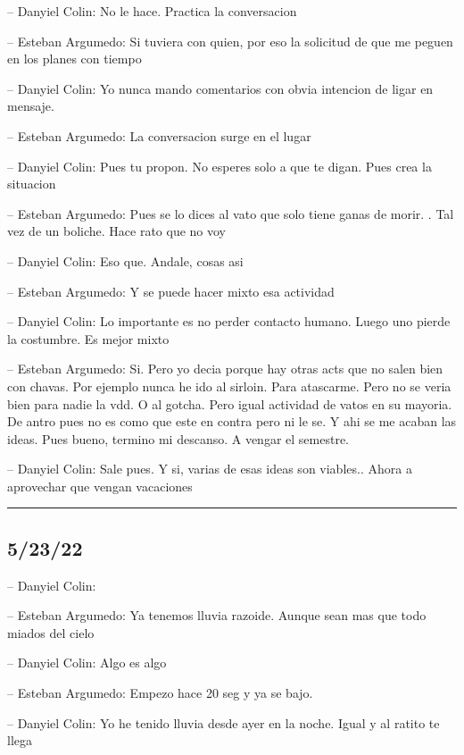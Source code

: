 -- Danyiel Colin: No le hace. Practica la conversacion

-- Esteban Argumedo: Si tuviera con quien, por eso la solicitud de que
me peguen en los planes con tiempo

-- Danyiel Colin: Yo nunca mando comentarios con obvia intencion de
ligar en mensaje.

-- Esteban Argumedo: La conversacion surge en el lugar

-- Danyiel Colin: Pues tu propon. No esperes solo a que te digan. Pues
crea la situacion

-- Esteban Argumedo: Pues se lo dices al vato que solo tiene ganas de
morir. . Tal vez de un boliche. Hace rato que no voy

-- Danyiel Colin: Eso que. Andale, cosas asi

-- Esteban Argumedo: Y se puede hacer mixto esa actividad

-- Danyiel Colin: Lo importante es no perder contacto humano. Luego uno
pierde la costumbre. Es mejor mixto

-- Esteban Argumedo: Si. Pero yo decia porque hay otras acts que no
salen bien con chavas. Por ejemplo nunca he ido al sirloin. Para
atascarme. Pero no se veria bien para nadie la vdd. O al gotcha. Pero
igual actividad de vatos en su mayoria. De antro pues no es como que
este en contra pero ni le se. Y ahi se me acaban las ideas. Pues bueno,
termino mi descanso. A vengar el semestre.

-- Danyiel Colin: Sale pues. Y si, varias de esas ideas son viables..
Ahora a aprovechar que vengan vacaciones

\begin{center}\rule{0.5\linewidth}{0.5pt}\end{center}

\hypertarget{section-84}{%
\subsection{5/23/22}\label{section-84}}

-- Danyiel Colin:

-- Esteban Argumedo: Ya tenemos lluvia razoide. Aunque sean mas que todo
miados del cielo

-- Danyiel Colin: Algo es algo

-- Esteban Argumedo: Empezo hace 20 seg y ya se bajo.

-- Danyiel Colin: Yo he tenido lluvia desde ayer en la noche. Igual y al
ratito te llega

